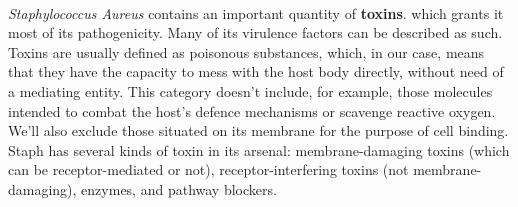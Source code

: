 \paragraph{}\emph{Staphylococcus Aureus} contains an important quantity of \textbf{toxins}. which grants it most of its pathogenicity. Many of its virulence factors can be described as such. Toxins are usually defined as poisonous substances, which, in our case, means that they have the capacity to mess with the host body directly, without need of a mediating entity. This category doesn't include, for example, those molecules intended to combat the host's defence mechanisms or scavenge reactive oxygen. We'll also exclude those situated on its membrane for the purpose of cell binding. Staph has several kinds of toxin in its arsenal: membrane-damaging toxins (which can be receptor-mediated or not), receptor-interfering toxins (not membrane-damaging), enzymes, and pathway blockers.\newline

